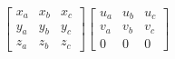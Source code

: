 \documentclass[12pt]{article}
\begin{document}
    \[
        \left[ \begin{array}{ccc}
        x_a & x_b & x_c \\
        y_a & y_b & y_c \\
        z_a & z_b & z_c
        \end{array} \right]
        \left[ \begin{array}{ccc}
        u_a & u_b & u_c \\
        v_a & v_b & v_c \\
        0   & 0   & 0
        \end{array} \right]
    \]
\end{document}
